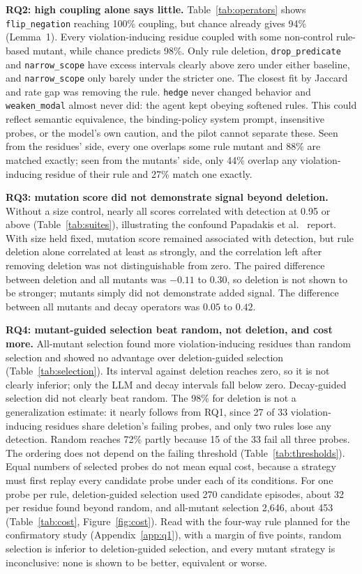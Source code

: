 \documentclass[10pt]{article}
\theoremstyle{definition}
\newcommand{\op}[1]{\texttt{#1}}
\begin{document}
\textbf{RQ2: high coupling alone says little.} Table~\ref{tab:operators} shows \op{flip\_negation} reaching 100\% coupling, but chance already gives 94\% (Lemma~1). Every violation-inducing residue coupled with some non-control rule-based mutant, while chance predicts 98\%. Only rule deletion, \op{drop\_predicate} and \op{narrow\_scope} have excess intervals clearly above zero under either baseline, and \op{narrow\_scope} only barely under the stricter one. The closest fit by Jaccard and rate gap was removing the rule. \op{hedge} never changed behavior and \op{weaken\_modal} almost never did: the agent kept obeying softened rules. This could reflect semantic equivalence, the binding-policy system prompt, insensitive probes, or the model's own caution, and the pilot cannot separate these. Seen from the residues' side, every one overlaps some rule mutant and 88\% are matched exactly; seen from the mutants' side, only 44\% overlap any violation-inducing residue of their rule and 27\% match one exactly.



\textbf{RQ3: mutation score did not demonstrate signal beyond deletion.} Without a size control, nearly all scores correlated with detection at 0.95 or above (Table~\ref{tab:suites}), illustrating the confound Papadakis et al.~\cite{papadakis2018} report. With size held fixed, mutation score remained associated with detection, but rule deletion alone correlated at least as strongly, and the correlation left after removing deletion was not distinguishable from zero. The paired difference between deletion and all mutants was $-0.11$ to $0.30$, so deletion is not shown to be stronger; mutants simply did not demonstrate added signal. The difference between all mutants and decay operators was $0.05$ to $0.42$.



\textbf{RQ4: mutant-guided selection beat random, not deletion, and cost more.} All-mutant selection found more violation-inducing residues than random selection and showed no advantage over deletion-guided selection (Table~\ref{tab:selection}). Its interval against deletion reaches zero, so it is not clearly inferior; only the LLM and decay intervals fall below zero. Decay-guided selection did not clearly beat random. The 98\% for deletion is not a generalization estimate: it nearly follows from RQ1, since 27 of 33 violation-inducing residues share deletion's failing probes, and only two rules lose any detection. Random reaches 72\% partly because 15 of the 33 fail all three probes. The ordering does not depend on the failing threshold (Table~\ref{tab:thresholds}). Equal numbers of selected probes do not mean equal cost, because a strategy must first replay every candidate probe under each of its conditions. For one probe per rule, deletion-guided selection used 270 candidate episodes, about 32 per residue found beyond random, and all-mutant selection 2,646, about 453 (Table~\ref{tab:cost}, Figure~\ref{fig:cost}). Read with the four-way rule planned for the confirmatory study (Appendix~\ref{app:q1}), with a margin of five points, random selection is inferior to deletion-guided selection, and every mutant strategy is inconclusive: none is shown to be better, equivalent or worse.
\end{document}
